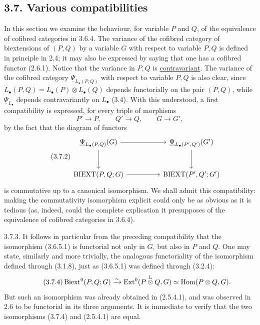 
\subsection*{3.7. Various compatibilities}

In this section we examine the behaviour, for variable $P$ and $Q$,
of the equivalence of cofibred categories in 3.6.4.  The variance of
the cofibred category of biextensions of $(P,Q)$ by a variable $G$
with respect to variable $P,Q$ is defined in principle in 2.4; it may
also be expressed by saying that one has a cofibred functor (2.6.1).
Notice that the variance in $P,Q$ is \underline{contravariant}.  The
variance of the cofibred category
$\underline\Psi_{L_\bullet(P,Q)}$ with respect to variable $P,Q$ is
also clear, since
$L_\bullet(P,Q)=L_\bullet(P)\otimes L_\bullet(Q)$ depends
functorially on the pair $(P,Q)$, while $\underline\Psi_{L_\bullet}$
depends contravariantly on $L_\bullet$ (3.4).  With this understood,
a first compatibility is expressed, for every triple of morphisms
\begin{equation}\tag{3.7.1}
 P'\longrightarrow P,\qquad
 Q'\longrightarrow Q,\qquad
 G\longrightarrow G',
\end{equation}
by the fact that the diagram of functors
\begin{equation}\tag{3.7.2}
\begin{tikzcd}[column sep=huge,row sep=large]
 \underline\Psi_{L_\bullet(P,Q)}(G)
   \arrow[r]\arrow[d]
 &\underline\Psi_{L_\bullet(P',Q')}(G')
   \arrow[d]\\
 \operatorname{BIEXT}(P,Q;G)
   \arrow[r]
 &\operatorname{BIEXT}(P',Q';G')
\end{tikzcd}
\end{equation}
is commutative up to a canonical isomorphism.  We shall admit this
compatibility: making the commutativity isomorphism explicit could
only be as obvious as it is tedious (as, indeed, could the complete
explication it presupposes of the equivalence of cofibred categories
in 3.6.4).

3.7.3. It follows in particular from the preceding compatibility
that the isomorphism (3.6.5.1) is functorial not only in $G$, but also
in $P$ and $Q$.  One may state, similarly and more trivially, the
analogous functoriality of the isomorphism defined through (3.1.8),
just as (3.6.5.1) was defined through (3.2.4):
\begin{equation}\tag{3.7.4}
 \operatorname{Biext}^0(P,Q;G)
 \xrightarrow{\sim}
 \operatorname{Ext}^0(P\mathbin{\overset{\mathbb L}{\otimes}}Q,G)
 \simeq\operatorname{Hom}(P\otimes Q,G).
\end{equation}
But such an isomorphism was already obtained in (2.5.4.1), and was
observed in 2.6 to be functorial in its three arguments.  It is
immediate to verify that the two isomorphisms (3.7.4) and (2.5.4.1)
are equal.

